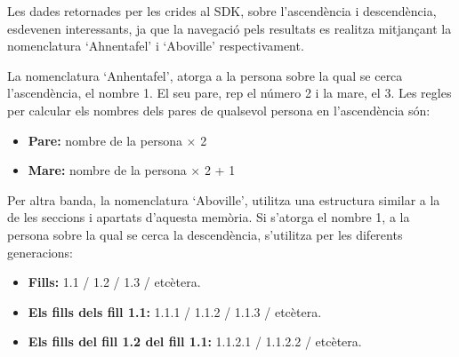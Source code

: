 Les dades retornades per les crides al SDK, sobre l'ascendència i descendència, esdevenen interessants, ja que la navegació pels resultats es realitza mitjançant la nomenclatura `Ahnentafel' i `Aboville' respectivament.

La nomenclatura `Anhentafel', atorga a la persona sobre la qual se cerca l'ascendència, el nombre 1. El seu pare, rep el número 2 i la mare, el 3. Les regles per calcular els nombres dels pares de qualsevol persona en l'ascendència són:

\begin{itemize}
    \item \textbf{Pare:} nombre de la persona $\times$ 2
    \item \textbf{Mare:} nombre de la persona $\times$ 2 + 1
\end{itemize}

Per altra banda, la nomenclatura `Aboville', utilitza una estructura similar a la de les seccions i apartats d'aquesta memòria. Si s'atorga el nombre 1, a la persona sobre la qual se cerca la descendència, s'utilitza per les diferents generacions:

\begin{itemize}
    \item \textbf{Fills:} 1.1 / 1.2 / 1.3 / etcètera.
    \item \textbf{Els fills dels fill 1.1:} 1.1.1 / 1.1.2 / 1.1.3 / etcètera.
    \item \textbf{Els fills del fill 1.2 del fill 1.1:} 1.1.2.1 / 1.1.2.2 / etcètera.
\end{itemize}
